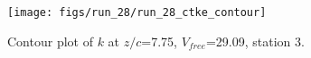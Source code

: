 \begin{figure}[H]
\centering
\texttt{[image: figs/run\_28/run\_28\_ctke\_contour]}
\caption{Contour plot of $k$ at $z/c$=7.75, $V_{free}$=29.09, station 3.}
\label{fig:run_28_ctke_contour}
\end{figure}


